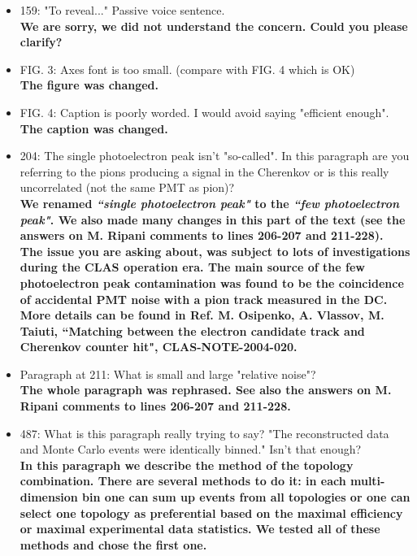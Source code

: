 \documentclass[,superscriptaddress,showpacs,amssymb,amsmath,amsfonts,linenumbers,article]{revtex4-1}
\begin{document}
\begin{itemize}
\item 159: "To reveal..." Passive voice sentence.\\
{\bf We are sorry, we did not understand the concern. Could you please clarify?}

\item FIG. 3: Axes font is too small. (compare with FIG. 4 which is OK)\\
{\bf The figure was changed.}

\item FIG. 4: Caption is poorly worded. I would avoid saying "efficient enough".\\
{\bf The caption was changed.}

\item 204: The single photoelectron peak isn't "so-called". In this paragraph are you referring to the pions producing a signal in the Cherenkov or is this really uncorrelated (not the same PMT as pion)?\\
{\bf We renamed \textbf{\textit{``single photoelectron peak"}} to the \textbf{\textit{``few photoelectron peak"}}. We also made many changes in this part of the text (see the answers on M. Ripani comments to lines 206-207 and 211-228).\\
The issue you are asking about, was subject to lots of investigations during the CLAS operation era. The main source of the few photoelectron peak contamination was found to be the coincidence of accidental PMT noise with a pion track measured in the DC. More details can be found in Ref. M. Osipenko, A. Vlassov, M. Taiuti,
``Matching between the electron candidate track and Cherenkov counter hit", CLAS-NOTE-2004-020.}

\item Paragraph at 211: What is small and large "relative noise"?\\
{\bf The whole paragraph was rephrased. See also the answers on M. Ripani comments to lines 206-207 and 211-228.}

\item 487: What is this paragraph really trying to say? "The reconstructed data and Monte Carlo events were identically binned." Isn't that enough?\\
{\bf In this paragraph we describe the method of the topology combination. There are several methods to do it: in each multi-dimension bin one can sum up events from all topologies or one can select one topology as preferential based on the maximal efficiency or maximal experimental data statistics. We tested all of these methods and chose the first one.}

\end{itemize}
\end{document}
